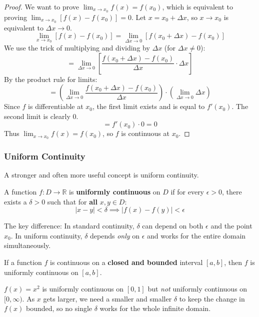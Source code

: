 \begin{proof}
We want to prove $\lim_{x \to x_0} f(x) = f(x_0)$, which is equivalent to proving $\lim_{x \to x_0} [f(x) - f(x_0)] = 0$.
Let $x = x_0 + \Delta x$, so $x \to x_0$ is equivalent to $\Delta x \to 0$.
\[
\lim_{x \to x_0} [f(x) - f(x_0)] = \lim_{\Delta x \to 0} [f(x_0 + \Delta x) - f(x_0)]
\]
We use the trick of multiplying and dividing by $\Delta x$ (for $\Delta x \neq 0$):
\[
= \lim_{\Delta x \to 0} \left[ \frac{f(x_0 + \Delta x) - f(x_0)}{\Delta x} \cdot \Delta x \right]
\]
By the product rule for limits:
\[
= \left( \lim_{\Delta x \to 0} \frac{f(x_0 + \Delta x) - f(x_0)}{\Delta x} \right) \cdot \left( \lim_{\Delta x \to 0} \Delta x \right)
\]
Since $f$ is differentiable at $x_0$, the first limit exists and is equal to $f'(x_0)$. The second limit is clearly $0$.
\[
= f'(x_0) \cdot 0 = 0
\]
Thus $\lim_{x \to x_0} f(x) = f(x_0)$, so $f$ is continuous at $x_0$.
\end{proof}
\subsubsection{Uniform Continuity}
A stronger and often more useful concept is uniform continuity.

\begin{definition}
A function $f: D \to \mathbb{R}$ is \textbf{uniformly continuous} on $D$ if for every $\epsilon > 0$, there exists a $\delta > 0$ such that for \textbf{all} $x, y \in D$:
\[ |x - y| < \delta \implies |f(x) - f(y)| < \epsilon \]
\end{definition}

The key difference: In standard continuity, $\delta$ can depend on both $\epsilon$ and the point $x_0$. In uniform continuity, $\delta$ depends \emph{only} on $\epsilon$ and works for the entire domain simultaneously.

\begin{theorem}
If a function $f$ is continuous on a \textbf{closed and bounded} interval $[a, b]$, then $f$ is uniformly continuous on $[a, b]$.
\end{theorem}

\begin{example}
$f(x) = x^2$ is uniformly continuous on $[0, 1]$ but \emph{not} uniformly continuous on $[0, \infty)$. As $x$ gets larger, we need a smaller and smaller $\delta$ to keep the change in $f(x)$ bounded, so no single $\delta$ works for the whole infinite domain.
\end{example}



